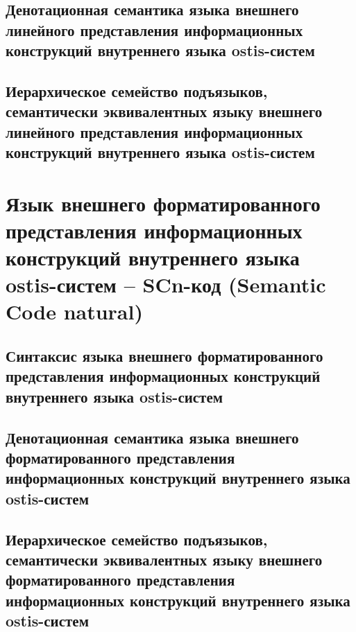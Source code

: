 \subsection{Денотационная семантика языка внешнего линейного представления информационных конструкций внутреннего языка ostis-систем}
\subsection{Иерархическое семейство подъязыков, семантически эквивалентных языку внешнего линейного представления информационных конструкций внутреннего языка ostis-систем}
\section{Язык внешнего форматированного представления информационных конструкций внутреннего языка ostis-систем -- SCn-код (Semantic Code natural)}
\subsection{Синтаксис языка внешнего форматированного представления информационных конструкций внутреннего языка ostis-систем}
\subsection{Денотационная семантика языка внешнего форматированного представления информационных конструкций внутреннего языка ostis-систем}
\subsection{Иерархическое семейство подъязыков, семантически эквивалентных языку внешнего форматированного представления информационных конструкций внутреннего языка ostis-систем}

%